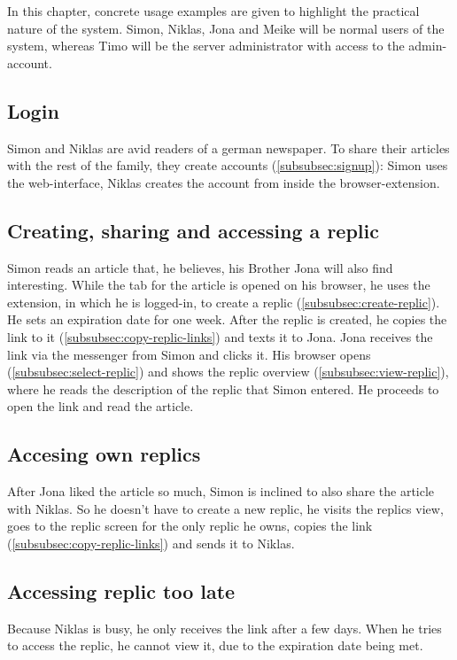 In this chapter, concrete usage examples are given to highlight the practical nature of the system.
Simon, Niklas, Jona and Meike will be normal users of the system, whereas Timo will be the server administrator with access to the admin-account.

\subsection{Login}\label{subsec:us-login}
Simon and Niklas are avid readers of a german newspaper.
To share their articles with the rest of the family, they create accounts (\ref{subsubsec:signup}): Simon uses the web-interface, Niklas creates the account from inside the browser-extension.

\subsection{Creating, sharing and accessing a replic}\label{subsec:us-creating-and-sharing-a-replic}
Simon reads an article that, he believes, his Brother Jona will also find interesting.
While the tab for the article is opened on his browser, he uses the extension, in which he is logged-in, to create a replic (\ref{subsubsec:create-replic}).
He sets an expiration date for one week.
After the replic is created, he copies the link to it (\ref{subsubsec:copy-replic-links}) and texts it to Jona. \newline
Jona receives the link via the messenger from Simon and clicks it.
His browser opens (\ref{subsubsec:select-replic}) and shows the replic overview (\ref{subsubsec:view-replic}), where he reads the description of the replic that Simon entered.
He proceeds to open the link and read the article.

\subsection{Accesing own replics}\label{subsec:us-accesing-own-replics}
After Jona liked the article so much, Simon is inclined to also share the article with Niklas.
So he doesn't have to create a new replic, he visits the replics view, goes to the replic screen for the only replic he owns, copies the link (\ref{subsubsec:copy-replic-links}) and sends it to Niklas.

\subsection{Accessing replic too late}\label{subsec:us-accessing-replic-too-late}
Because Niklas is busy, he only receives the link after a few days.
When he tries to access the replic, he cannot view it, due to the expiration date being met.

